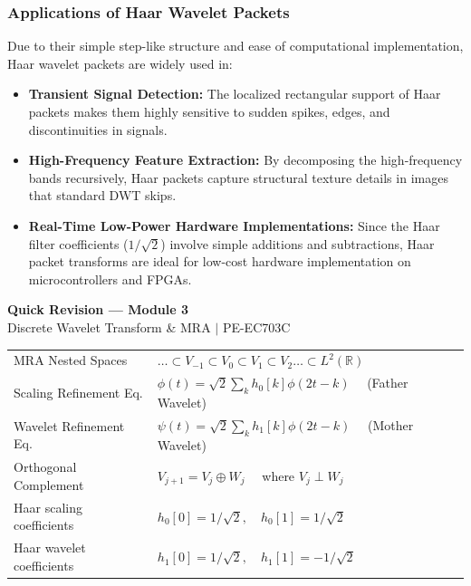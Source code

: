 \documentclass[12pt,a4paper]{article}
\renewcommand{\arraystretch}{1.45}
\begin{document}
\subsubsection{Applications of Haar Wavelet Packets}
Due to their simple step-like structure and ease of computational implementation, Haar wavelet packets are widely used in:
\begin{itemize}[leftmargin=*, itemsep=3.5pt]
  \item \textbf{Transient Signal Detection:} The localized rectangular support of Haar packets makes them highly sensitive to sudden spikes, edges, and discontinuities in signals.
  \item \textbf{High-Frequency Feature Extraction:} By decomposing the high-frequency bands recursively, Haar packets capture structural texture details in images that standard DWT skips.
  \item \textbf{Real-Time Low-Power Hardware Implementations:} Since the Haar filter coefficients ($1/\sqrt{2}$) involve simple additions and subtractions, Haar packet transforms are ideal for low-cost hardware implementation on microcontrollers and FPGAs.
\end{itemize}

\newpage
\begin{center}
  {\large\bfseries\color{myred} Quick Revision --- Module 3}\\[3pt]
  {\small\color{mydark} Discrete Wavelet Transform \& MRA $|$ PE-EC703C}
\end{center}
\noindent{\color{myred}\rule{\linewidth}{1.2pt}}
\vspace{4pt}

\begin{tcolorbox}[formulabox, title={\textbf{Key DWT \& MRA Equations}}]
\renewcommand{\arraystretch}{1.35}
\begin{tabularx}{\linewidth}{B{5.0cm} X}
MRA Nested Spaces & $\dots \subset V_{-1} \subset V_0 \subset V_1 \subset V_2 \dots \subset L^2(\mathbb{R})$ \\[4pt]
Scaling Refinement Eq. & $\phi(t) = \sqrt{2} \sum_{k} h_0[k] \phi(2t - k) \quad$ (Father Wavelet) \\[4pt]
Wavelet Refinement Eq. & $\psi(t) = \sqrt{2} \sum_{k} h_1[k] \phi(2t - k) \quad$ (Mother Wavelet) \\[4pt]
Orthogonal Complement & $V_{j+1} = V_j \oplus W_j \quad$ where $V_j \perp W_j$ \\[4pt]
Haar scaling coefficients & $h_0[0] = 1/\sqrt{2}, \quad h_0[1] = 1/\sqrt{2}$ \\[4pt]
Haar wavelet coefficients & $h_1[0] = 1/\sqrt{2}, \quad h_1[1] = -1/\sqrt{2}$
\end{tabularx}
\end{tcolorbox}
\end{document}
